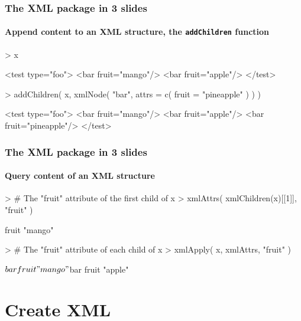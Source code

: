 \documentclass[smaller]{beamer}
\newcommand{\rfun}[1]{\texttt{#1}}
\begin{document}
\begin{frame}[fragile]
 \frametitle{The XML package in 3 slides}
\framesubtitle{Append content to an XML structure, the \rfun{addChildren} function}

\begin{Schunk}
\begin{Sinput}
> x
\end{Sinput}
\begin{Soutput}
<test type="foo">
 <bar fruit="mango"/>
 <bar fruit="apple"/>
</test>
\end{Soutput}
\begin{Sinput}
> addChildren( x, 
    xmlNode( "bar", attrs = 
      c( fruit = "pineapple" ) ) )
\end{Sinput}
\begin{Soutput}
<test type="foo">
 <bar fruit="mango"/>
 <bar fruit="apple"/>
 <bar fruit="pineapple"/>
</test>
\end{Soutput}
\end{Schunk}
\end{frame}


\begin{frame}[fragile]
 \frametitle{The XML package in 3 slides}
\framesubtitle{Query content of an XML structure}

\begin{Schunk}
\begin{Sinput}
> # The "fruit" attribute of the first child of x
> xmlAttrs( xmlChildren(x)[[1]], "fruit" )
\end{Sinput}
\begin{Soutput}
  fruit 
"mango" 
\end{Soutput}
\begin{Sinput}
> # The "fruit" attribute of each child of x
> xmlApply( x, xmlAttrs, "fruit" )
\end{Sinput}
\begin{Soutput}
$bar
  fruit 
"mango" 

$bar
  fruit 
"apple" 
\end{Soutput}
\end{Schunk}
\end{frame}



\section{Create XML}
\end{document}

